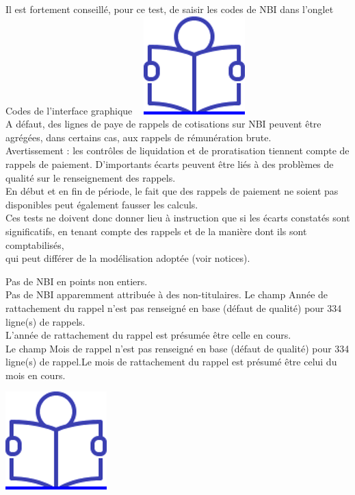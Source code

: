 Il est fortement conseillé, pour ce test, de saisir les codes de NBI
dans l'onglet Codes de l'interface graphique ~
\href{../Docs/Notices/fiche_onglet_codes.odt}{\includegraphics{icones/Notice.png}}\\
A défaut, des lignes de paye de rappels de cotisations sur NBI peuvent
être agrégées, dans certains cas, aux rappels de rémunération brute.\\
Avertissement : les contrôles de liquidation et de proratisation
tiennent compte de rappels de paiement. D'importants écarts peuvent être
liés à des problèmes de qualité sur le renseignement des rappels.\\
En début et en fin de période, le fait que des rappels de paiement ne
soient pas disponibles peut également fausser les calculs.\\
Ces tests ne doivent donc donner lieu à instruction que si les écarts
constatés sont significatifs, en tenant compte des rappels et de la
manière dont ils sont comptabilisés,\\
qui peut différer de la modélisation adoptée (voir notices).

Pas de NBI en points non entiers.\\
Pas de NBI apparemment attribuée à des non-titulaires. Le champ Année de
rattachement du rappel n'est pas renseigné en base (défaut de qualité)
pour 334 ligne(s) de rappels.\\
L'année de rattachement du rappel est présumée être celle en cours.\\
Le champ Mois de rappel n'est pas renseigné en base (défaut de qualité)
pour 334 ligne(s) de rappel.Le mois de rattachement du rappel est
présumé être celui du mois en cours.

\href{../Docs/Notices/fiche_NBI_nt.odt}{\includegraphics{icones/Notice.png}}

